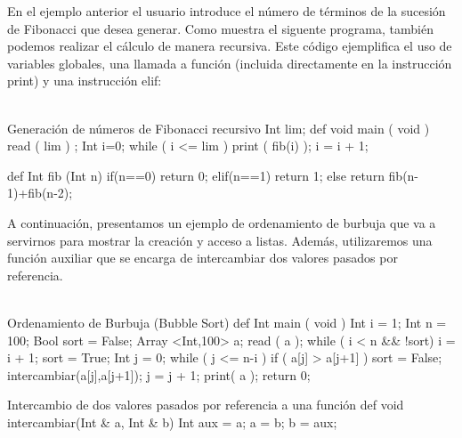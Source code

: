 \documentclass[12pt,onecolumn]{article}
\begin{document}
		\vspace{\baselineskip}
		\vspace{\baselineskip}
		
		En el ejemplo anterior el usuario introduce el número de términos de la sucesión de Fibonacci que desea generar. Como muestra el siguente programa, también podemos realizar el cálculo de manera recursiva. Este código ejemplifica el uso de variables globales, una llamada a función (incluida directamente en la instrucción print) y una instrucción elif: \\ \\
		
		\begin{wgetlisting}{Generación de números de Fibonacci recursivo}
Int lim;
def void main ( void ) {
 	read ( lim ) ;
 	Int i=0;
	while ( i <= lim ) {
		print ( fib(i) );
		i = i + 1;
	}
}

def Int fib (Int n) {
	if(n==0){
		return 0;
	} elif(n==1){
		return 1;
	} else{
		return fib(n-1)+fib(n-2);
	}
}
		\end{wgetlisting}
		
		\vspace{\baselineskip}
		\vspace{\baselineskip}
		\newpage
		
		A continuación, presentamos un ejemplo de ordenamiento de burbuja que va a servirnos para mostrar la creación y acceso a listas. Además, utilizaremos una función auxiliar que se encarga de intercambiar dos valores pasados por referencia. \\ \\
		
		\begin{wgetlisting}{Ordenamiento de Burbuja (Bubble Sort)}
def Int main ( void ) {
  	Int i = 1;
  	Int n = 100;
  	Bool sort = False;
  	Array <Int,100> a;
  	read ( a );
  	while ( i < n && !sort) {
 	    i = i + 1;
  	    sort = True;
  	    Int j = 0;
	    while ( j <= n-i ) {
		if ( a[j] > a[j+1] ) {
		    sort = False;
	    	    intercambiar(a[j],a[j+1]);
		}
		j = j + 1;
	    }
  	}
  	print( a );
  	return 0;
}
		\end{wgetlisting}
		
		\vspace{\baselineskip}
		\vspace{\baselineskip}

		\begin{wgetlisting}{Intercambio de dos valores pasados por referencia a una función}
def void intercambiar(Int & a, Int & b) {
	Int aux = a;
	a = b;
	b = aux;
}
		\end{wgetlisting}
		
\end{document}
